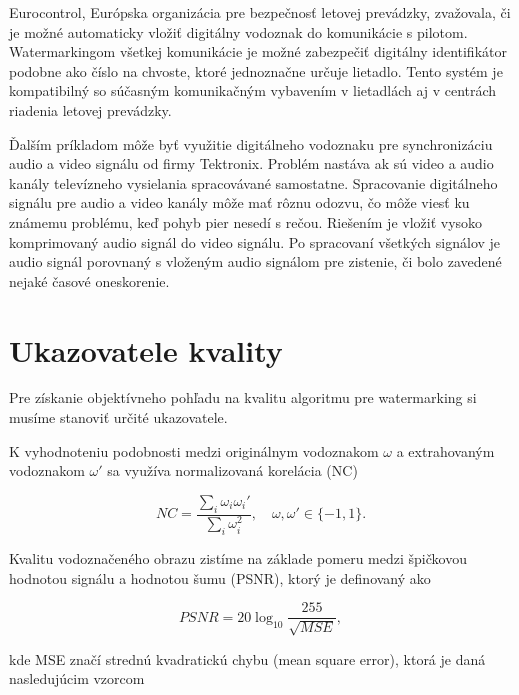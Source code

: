 Eurocontrol, Európska organizácia pre bezpečnosť letovej prevádzky, zvažovala, či je možné automaticky vložiť digitálny vodoznak do komunikácie s pilotom. Watermarkingom všetkej komunikácie je možné zabezpečiť digitálny identifikátor podobne ako číslo na chvoste, ktoré jednoznačne určuje lietadlo. Tento systém je kompatibilný so súčasným komunikačným vybavením v lietadlách aj v centrách riadenia letovej prevádzky.

Ďalším príkladom môže byť využitie digitálneho vodoznaku pre synchronizáciu audio a video signálu od firmy Tektronix. Problém nastáva ak sú video a audio kanály televízneho vysielania spracovávané samostatne. Spracovanie digitálneho signálu pre audio a video kanály môže mať rôznu odozvu, čo môže viesť ku známemu problému, keď pohyb pier nesedí s rečou. Riešením je vložiť vysoko komprimovaný audio signál do video signálu. Po spracovaní všetkých signálov je audio signál porovnaný s vloženým audio signálom pre zistenie, či bolo zavedené nejaké časové oneskorenie. \cite{Cox}


\section{Ukazovatele kvality}
Pre získanie objektívneho pohľadu na kvalitu algoritmu pre watermarking si musíme stanoviť určité ukazovatele.

K vyhodnoteniu podobnosti medzi originálnym vodoznakom $\omega$ a extrahovaným vodoznakom $\omega'$ sa využíva normalizovaná korelácia (NC) \cite{QRdecomposition}

\begin{equation}
NC = \frac{\sum_i \omega_i \omega_i'}{\sum_i \omega_i^2},\quad \omega,\omega'\in \{-1,1\}.
\end{equation}

Kvalitu vodoznačeného obrazu zistíme na základe pomeru medzi špičkovou hodnotou signálu a hodnotou šumu (PSNR), ktorý je definovaný ako

\begin{equation}
PSNR = 20\log_{10} \frac{255}{\sqrt{MSE}},
\end{equation}

kde MSE značí strednú kvadratickú chybu (mean square error), ktorá je daná nasledujúcim vzorcom

